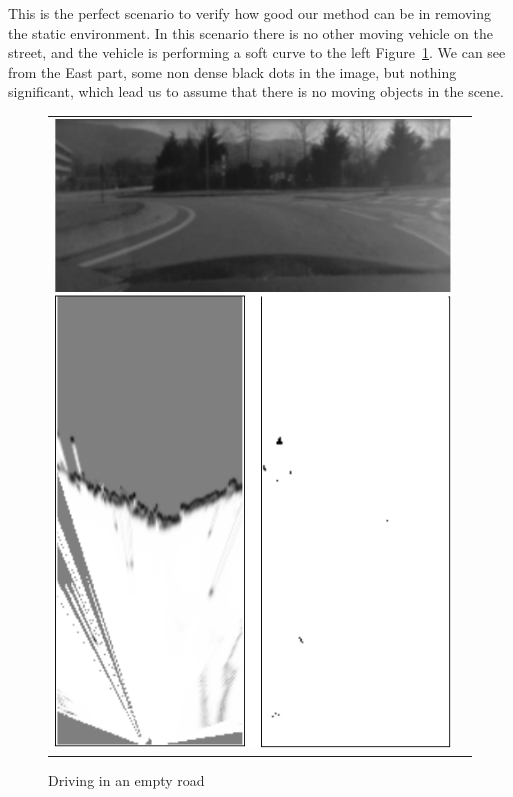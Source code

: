 This is the perfect scenario to verify how good our method can be in removing the static environment. In this scenario there is no other moving vehicle on the street, and the vehicle is performing a soft curve to the left Figure~\ref{fig:result:scenestatic}. We can see from the East part, some non dense black dots in the image, but nothing significant, which lead us to assume that there is no moving objects in the scene.

\begin{figure}[H]
   \centering
     \begin{tabular}{lr}
       \includegraphics[scale=0.60]{img/fig:result:scenestatic}
     \end{tabular}
   \caption{Driving in an empty road}
   \label{fig:result:scenestatic}
\end{figure}